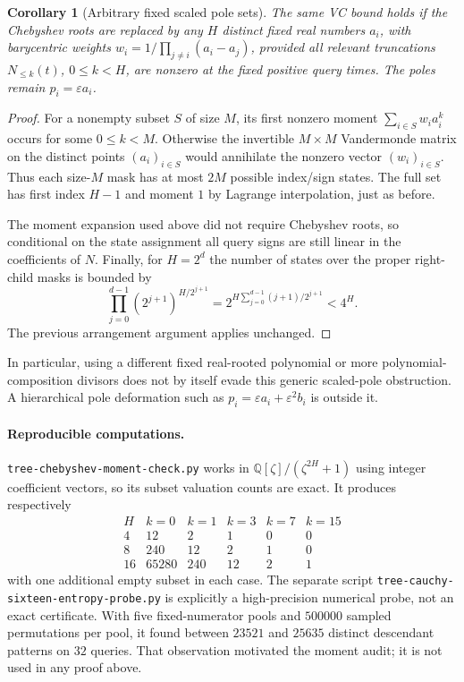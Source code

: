\documentclass[11pt]{article}
\newtheorem{corollary}{Corollary}
\begin{document}
\begin{corollary}[Arbitrary fixed scaled pole sets]
The same VC bound holds if the Chebyshev roots are replaced by any
$H$ distinct fixed real numbers $a_i$, with barycentric weights
$w_i=1/\prod_{j\ne i}(a_i-a_j)$, provided all relevant truncations
$N_{\leq k}(t)$, $0\leq k<H$, are nonzero at the fixed positive
query times. The poles remain $p_i=\varepsilon a_i$.
\end{corollary}
\begin{proof}
For a nonempty subset $S$ of size $M$, its first nonzero moment
$\sum_{i\in S}w_i a_i^k$ occurs for some $0\leq k<M$.
Otherwise the invertible $M\times M$ Vandermonde matrix on the
distinct points $(a_i)_{i\in S}$ would annihilate the nonzero vector
$(w_i)_{i\in S}$. Thus each size-$M$ mask has at most $2M$ possible
index/sign states. The full set has first index $H-1$ and moment $1$
by Lagrange interpolation, just as before.

The moment expansion used above did not require Chebyshev roots, so
conditional on the state assignment all query signs are still linear
in the coefficients of $N$. Finally, for $H=2^d$ the number of states
over the proper right-child masks is bounded by
\[
 \prod_{j=0}^{d-1}(2^{j+1})^{H/2^{j+1}}
 =2^{H\sum_{j=0}^{d-1}(j+1)/2^{j+1}}<4^H.
\]
The previous arrangement argument applies unchanged.
\end{proof}

In particular, using a different fixed real-rooted polynomial or
more polynomial-composition divisors does not by itself evade this
generic scaled-pole obstruction. A hierarchical pole deformation
such as $p_i=\varepsilon a_i+\varepsilon^2 b_i$ is outside it.

\paragraph{Reproducible computations.}
\texttt{tree-chebyshev-moment-check.py} works in
$\mathbb Q[\zeta]/(\zeta^{2H}+1)$ using integer coefficient vectors,
so its subset valuation counts are exact. It produces respectively
\[
\begin{array}{c|rrrrr}
H&k=0&k=1&k=3&k=7&k=15\\\hline
4&12&2&1&0&0\\
8&240&12&2&1&0\\
16&65280&240&12&2&1
\end{array}
\]
with one additional empty subset in each case.
The separate script \texttt{tree-cauchy-sixteen-entropy-probe.py} is
explicitly a high-precision numerical probe, not an exact certificate.
With five fixed-numerator pools and $500000$ sampled permutations per
pool, it found between $23521$ and $25635$ distinct descendant patterns
on $32$ queries. That observation motivated the moment audit; it is
not used in any proof above.
\end{document}
